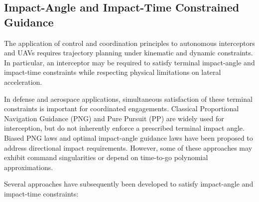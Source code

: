 \subsection{Impact-Angle and Impact-Time Constrained Guidance}
\label{subsec:constrained_guidance}

The application of control and coordination principles to autonomous interceptors and UAVs requires trajectory planning under kinematic and dynamic constraints. In particular, an interceptor may be required to satisfy terminal impact-angle and impact-time constraints while respecting physical limitations on lateral acceleration.

In defense and aerospace applications, simultaneous satisfaction of these terminal constraints is important for coordinated engagements. Classical Proportional Navigation Guidance (PNG) \cite{SHNEYDOR1998101} and Pure Pursuit (PP) \cite{SHNEYDOR199847} are widely used for interception, but do not inherently enforce a prescribed terminal impact angle. Biased PNG laws \cite{kim1998BPNG} and optimal impact-angle guidance laws \cite{Ryoo, ratnoo2009state} have been proposed to address directional impact requirements. However, some of these approaches may exhibit command singularities or depend on time-to-go polynomial approximations.

Several approaches have subsequently been developed to satisfy impact-angle and impact-time constraints:

